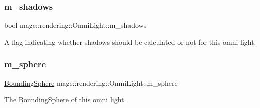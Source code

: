 \subsubsection{\texorpdfstring{m\+\_\+shadows}{m\_shadows}}
{\footnotesize\ttfamily bool mage\+::rendering\+::\+Omni\+Light\+::m\+\_\+shadows\hspace{0.3cm}{\ttfamily [private]}}

A flag indicating whether shadows should be calculated or not for this omni light. \mbox{\label{classmage_1_1rendering_1_1_omni_light_af11a99e2b1500093b9bd0e3ff16b04e6}} 
\subsubsection{\texorpdfstring{m\+\_\+sphere}{m\_sphere}}
{\footnotesize\ttfamily \mbox{\hyperlink{classmage_1_1_bounding_sphere}{Bounding\+Sphere}} mage\+::rendering\+::\+Omni\+Light\+::m\+\_\+sphere\hspace{0.3cm}{\ttfamily [private]}}

The \mbox{\hyperlink{classmage_1_1_bounding_sphere}{Bounding\+Sphere}} of this omni light. 